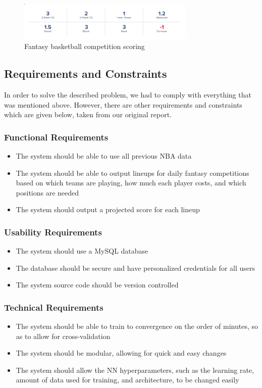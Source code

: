 \begin{figure}[ht]
    \centering
    \includegraphics[width=0.75\textwidth]{figures/fantasy_competition_scoring}
    \caption{Fantasy basketball competition scoring}
    \label{fig:comp_scoring}
\end{figure}

\subsection{Requirements and Constraints}
In order to solve the described problem, we had to comply with everything that was mentioned above. However, there are other requirements and constraints which are given below, taken from our original report.
\subsubsection{Functional Requirements}
\begin{itemize}
\item The system should be able to use all previous NBA data
\item The system should be able to output lineups for daily fantasy competitions based on which teams are playing, how much each player costs, and which positions are needed
\item The system should output a projected score for each lineup
\end{itemize}

\subsubsection{Usability Requirements}
\begin{itemize}
\item The system should use a MySQL database
\item The database should be secure and have personalized credentials for all users
\item The system source code should be version controlled
\end{itemize}

\subsubsection{Technical Requirements}
\begin{itemize}
\item The system should be able to train to convergence on the order of minutes, so as to allow for cross-validation
\item The system should be modular, allowing for quick and easy changes
\item The system should allow the NN hyperparameters, such as the learning rate, amount of data used for training, and architecture, to be changed easily
\end{itemize}

